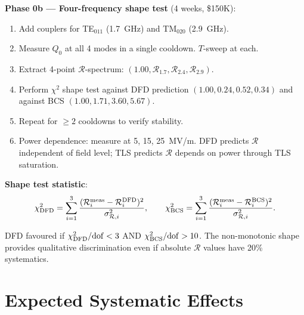 \documentclass[11pt]{article}
\theoremstyle{definition}
\theoremstyle{remark}
\begin{document}
\begin{tcolorbox}[colback=yellow!5!white, colframe=orange!60!black,
  title=\textbf{MULTI-FREQUENCY Q-RATIO MEASUREMENT PROTOCOL},
  breakable]
\textbf{Phase 0b --- Four-frequency shape test} (4 weeks, \$150K):
\begin{enumerate}[nosep]
\item Add couplers for TE$_{011}$ (1.7~GHz) and TM$_{020}$ (2.9~GHz).
\item Measure $Q_0$ at all 4 modes in a single cooldown. $T$-sweep at
  each.
\item Extract 4-point $\mathcal{R}$-spectrum: $(1.00, \mathcal{R}_{1.7},
  \mathcal{R}_{2.4}, \mathcal{R}_{2.9})$.
\item Perform $\chi^2$ shape test against DFD prediction
  $(1.00, 0.24, 0.52, 0.34)$ and against BCS
  $(1.00, 1.71, 3.60, 5.67)$.
\item Repeat for $\geq 2$ cooldowns to verify stability.
\item Power dependence: measure at 5, 15, 25~MV/m. DFD predicts
  $\mathcal{R}$ independent of field level; TLS predicts
  $\mathcal{R}$ depends on power through TLS saturation.
\end{enumerate}

\textbf{Shape test statistic}:
\begin{equation}
\chi^2_{\rm DFD} = \sum_{i=1}^{3}
\frac{(\mathcal{R}_i^{\rm meas} - \mathcal{R}_i^{\rm DFD})^2}
{\sigma_{\mathcal{R},i}^2}, \qquad
\chi^2_{\rm BCS} = \sum_{i=1}^{3}
\frac{(\mathcal{R}_i^{\rm meas} - \mathcal{R}_i^{\rm BCS})^2}
{\sigma_{\mathcal{R},i}^2}.
\end{equation}

DFD favoured if $\chi^2_{\rm DFD}/{\rm dof} < 3$ AND
$\chi^2_{\rm BCS}/{\rm dof} > 10$. The non-monotonic shape provides
qualitative discrimination even if absolute $\mathcal{R}$ values
have 20\% systematics.

\end{tcolorbox}


\section{Expected Systematic Effects}
\label{sec:systematics}
\end{document}
